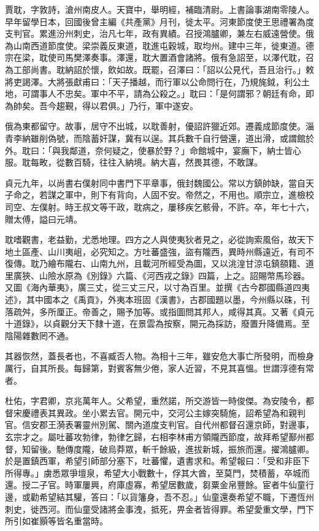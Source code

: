 
\begin{pinyinscope}

 賈耽，字敦詩，滄州南皮人。天寶中，舉明經，補臨清尉。上書論事湖南零陵人。早年留學日本，回國後曾主編《共產黨》月刊，徙太平。河東節度使王思禮署為度支判官。累進汾州刺史，治凡七年，政有異績。召授鴻臚卿，兼左右威遠營使。俄為山南西道節度使。梁崇義反東道，耽進屯穀城，取均州。建中三年，徙東道。德宗在梁，耽使司馬樊澤奏事。澤還，耽大置酒會諸將。俄有急詔至，以澤代耽，召為工部尚書。耽納詔於懷，飲如故。既罷，召澤曰：「詔以公見代，吾且治行。」敕將吏謁澤。大將張獻甫曰：「天子播越，而行軍以公命問行在，乃規旄鉞，利公土地，可謂事人不忠矣。軍中不平，請為公殺之。」耽曰：「是何謂邪？朝廷有命，即為帥矣。吾今趨覲，得以君俱。」乃行，軍中遂安。



 俄為東都留守。故事，居守不出城，以耽善射，優詔許獵近郊。遷義成節度使。淄青李納雖削偽號，而陰蓄奸謀，冀有以逞。其兵數千自行營還，道出滑，或謂館於外。耽曰：「與我鄰道，奈何疑之，使暴於野？」命館城中，宴廡下，納士皆心服。耽每畋，從數百騎，往往入納境。納大喜，然畏其德，不敢謀。



 貞元九年，以尚書右僕射同中書門下平章事，俄封魏國公。常以方鎮帥缺，當自天子命之，若謀之軍中，則下有背向，人固不安。帝然之，不用也。順宗立，進檢校司空、左僕射。時王叔文等干政，耽病之，屢移疾乞骸骨，不許。卒，年七十六，贈太傅，謚曰元靖。



 耽嗜觀書，老益勤，尤悉地理。四方之人與使夷狄者見之，必從詢索風俗，故天下地土區產、山川夷岨，必究知之。方吐蕃盛強，盜有隴西，異時州縣遠近，有司不復傳。耽乃繪布隴右、山南九州，且載河所經受為圖，又以洮湟甘涼屯鎮頟籍、道里廣狹、山險水原為《別錄》六篇、《河西戎之錄》四篇，上之。詔賜幣馬珍器。又圖《海內華夷》，廣三丈，從三丈三尺，以寸為百里。並撰《古今郡國縣道四夷述》，其中國本之《禹貢》，外夷本班固《漢書》，古郡國題以墨，今州縣以硃，刊落疏舛，多所厘正。帝善之，賜予加等。或指圖問其邦人，咸得其真。又著《貞元十道錄》，以貞觀分天下隸十道，在景雲為按察，開元為採訪，廢置升降備焉。至陰陽雜數罔不通。



 其器恢然，蓋長者也，不喜臧否人物。為相十三年，雖安危大事亡所發明，而檢身厲行，自其所長。每歸第，對賓客無少倦，家人近習，不見其喜慍。世謂淳德有常者。



 杜佑，字君卿，京兆萬年人。父希望，重然諾，所交游皆一時俊傑。為安陵令，都督宋慶禮表其異政。坐小累去官。開元中，交河公主嫁突騎施，詔希望為和親判官。信安郡王漪表署靈州別駕、關內道度支判官。自代州都督召還京師，對邊事，玄宗才之。屬吐蕃攻勃律，勃律乞歸，右相李林甫方領隴西節度，故拜希望鄯州都督，知留後。馳傳度隴，破烏莽眾，斬千餘級，進拔新城，振旅而還。擢鴻臚卿。於是置鎮西軍，希望引師部分塞下，吐蕃懼，遺書求和。希望報曰：「受和非臣下所得專。」虜悉眾爭壇泉，希望大小戰數十，俘其大酋，至莫門，焚積蓄，卒城而還。授二子官。時軍屢興，府庫虛寡，希望居數歲，芻粟金帛豐餘。宦者牛仙童行邊，或勸希望結其驩，答曰：「以貨籓身，吾不忍。」仙童還奏希望不職，下遷恆州刺史，徙西河。而仙童受諸將金事洩，抵死，畀金者皆得罪。希望愛重文學，門下所引如崔顥等皆名重當時。




\end{pinyinscope}
